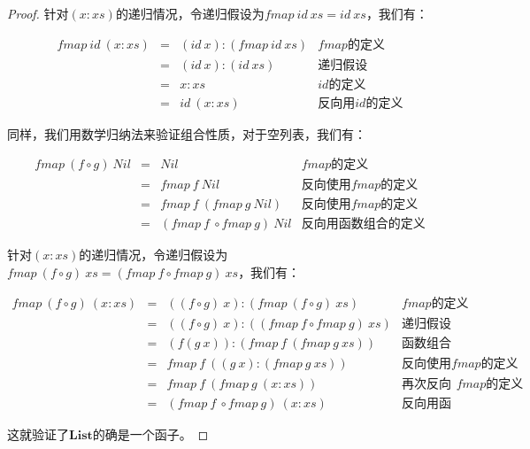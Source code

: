\documentclass{article}
\begin{document}
\begin{example}
\begin{proof}
针对$(x:xs)$的递归情况，令递归假设为$fmap\ id\ xs = id\ xs$，我们有：

\[
\begin{array}{rcll}
fmap\ id\ (x:xs) & = & (id\ x):(fmap\ id\ xs) & \text{$fmap$的定义} \\
                 & = & (id\ x):(id\ xs) & \text{递归假设} \\
                 & = & x:xs & \text{$id$的定义} \\
                 & = & id\ (x:xs) & \text{反向用$id$的定义}
\end{array}
\]

同样，我们用数学归纳法来验证组合性质，对于空列表，我们有：

\[
\begin{array}{rcll}
fmap\ (f \circ g)\ Nil & = & Nil & \text{$fmap$的定义} \\
           & = & fmap\ f\ Nil & \text{反向使用$fmap$的定义} \\
           & = & fmap\ f\ (fmap\ g\ Nil) & \text{反向使用$fmap$的定义} \\
           & = & (fmap\ f\ \circ fmap\ g)\ Nil & \text{反向用函数组合的定义}
\end{array}
\]

针对$(x:xs)$的递归情况，令递归假设为$fmap\ (f \circ g)\ xs = (fmap\ f \circ fmap\ g)\ xs$，我们有：

\[
\begin{array}{rcll}
fmap\ (f \circ g)\ (x:xs) & = & ((f \circ g)\ x):(fmap\ (f \circ g)\ xs) & \text{$fmap$的定义} \\
  & = & ((f \circ g)\ x):((fmap\ f \circ fmap\ g)\ xs) & \text{递归假设} \\
  & = & (f(g\ x)):(fmap\ f\ (fmap\ g\ xs)) & \text{函数组合的定义} \\
  & = & fmap\ f\ ((g\ x):(fmap\ g\ xs)) & \text{反向使用$fmap$的定义} \\
  & = & fmap\ f\ (fmap\ g\ (x:xs)) & \text{再次反向使用$fmap$的定义} \\
  & = & (fmap\ f\ \circ fmap\ g)\ (x:xs) & \text{反向用函数组合的定义}
\end{array}
\]

这就验证了$\mathbf{List}$的确是一个函子。
\end{proof}
\end{example}

\begin{Exercise}
\end{Exercise}
\end{document}
